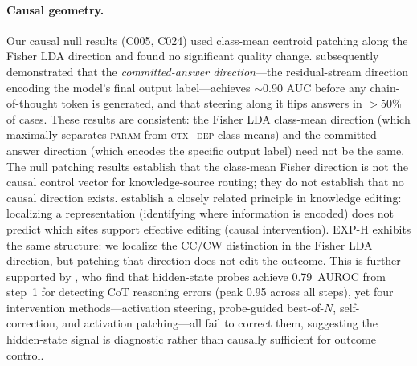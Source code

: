 \documentclass[11pt]{article}
\begin{document}
\paragraph{Causal geometry.}
Our causal null results (C005, C024) used class-mean centroid patching along the Fisher
LDA direction and found no significant quality change.
\citet{cox2026decoding} subsequently demonstrated that the \emph{committed-answer
direction}---the residual-stream direction encoding the model's final output
label---achieves $\sim$0.90 AUC before any chain-of-thought token is generated, and
that steering along it flips answers in $>$50\% of cases.
These results are consistent: the Fisher LDA class-mean direction (which maximally
separates \textsc{param} from \textsc{ctx\_dep} class means) and the committed-answer
direction (which encodes the specific output label) need not be the same.
The null patching results establish that the class-mean Fisher direction is not the
causal control vector for knowledge-source routing; they do not establish that no causal
direction exists. \citet{hase2023localization} establish a closely related principle in
knowledge editing: localizing a representation (identifying where information is encoded)
does not predict which sites support effective editing (causal intervention). EXP-H
exhibits the same structure: we localize the CC/CW distinction in the Fisher LDA
direction, but patching that direction does not edit the outcome.
This is further supported by \citet{hiddenerror2026}, who find that hidden-state
probes achieve 0.79~AUROC from step~1 for detecting CoT reasoning errors (peak 0.95 across all steps), yet
four intervention methods---activation steering, probe-guided best-of-$N$,
self-correction, and activation patching---all fail to correct them, suggesting the
hidden-state signal is diagnostic rather than causally sufficient for outcome control.
\end{document}
